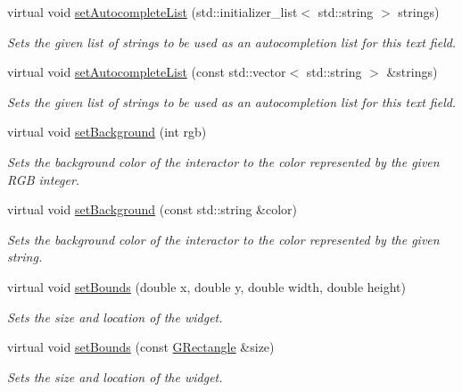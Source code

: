 \begin{DoxyCompactItemize}
virtual void \mbox{\hyperlink{classsgl_1_1GTextField_ab0245df51aa762af89f0d2cf31ce6ddd}{set\+Autocomplete\+List}} (std\+::initializer\+\_\+list$<$ std\+::string $>$ strings)
\begin{DoxyCompactList}\small\item\em Sets the given list of strings to be used as an autocompletion list for this text field. \end{DoxyCompactList}\item 
virtual void \mbox{\hyperlink{classsgl_1_1GTextField_aee449aad44655f02ed75727b3f6dd4d6}{set\+Autocomplete\+List}} (const std\+::vector$<$ std\+::string $>$ \&strings)
\begin{DoxyCompactList}\small\item\em Sets the given list of strings to be used as an autocompletion list for this text field. \end{DoxyCompactList}\item 
virtual void \mbox{\hyperlink{classsgl_1_1GInteractor_acba7e546c2025c0a15ca4b4cc92043db}{set\+Background}} (int rgb)
\begin{DoxyCompactList}\small\item\em Sets the background color of the interactor to the color represented by the given R\+GB integer. \end{DoxyCompactList}\item 
virtual void \mbox{\hyperlink{classsgl_1_1GInteractor_ab4677ab2474e68b07aa56605af92a84a}{set\+Background}} (const std\+::string \&color)
\begin{DoxyCompactList}\small\item\em Sets the background color of the interactor to the color represented by the given string. \end{DoxyCompactList}\item 
virtual void \mbox{\hyperlink{classsgl_1_1GInteractor_a2aae8197624b72265ab83b4f1bc73f2f}{set\+Bounds}} (double x, double y, double width, double height)
\begin{DoxyCompactList}\small\item\em Sets the size and location of the widget. \end{DoxyCompactList}\item 
virtual void \mbox{\hyperlink{classsgl_1_1GInteractor_acada386653f008cacc7cce86426bef7c}{set\+Bounds}} (const \mbox{\hyperlink{structsgl_1_1GRectangle}{G\+Rectangle}} \&size)
\begin{DoxyCompactList}\small\item\em Sets the size and location of the widget. \end{DoxyCompactList}\item 

\end{DoxyCompactItemize}
